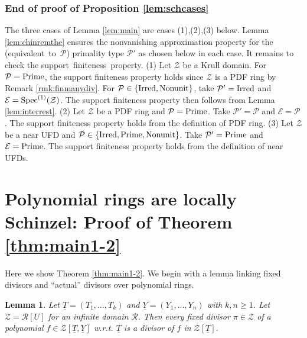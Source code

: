 \documentclass[11pt,a4paper,reqno]{amsart}
\def\s1{{\rm Spec}^{(1)}}
\newtheorem{lem}[thm]{Lemma}
\theoremstyle{definition}
\begin{document}
\subsubsection{End of proof of Proposition \ref{lem:schcases}}\label{ssc:enproof36} The three cases of Lemma \ref{lem:main} are cases (1),(2),(3) below. Lemma \ref{lem:chinremthe} ensures the nonvanishing approximation property for the \hbox{(equivalent to ${\mathcal P}$)} primal\-ity type $\mathcal{P}'$ as chosen below in each case. It remains to check the \hbox{support finiteness property.}
\vskip 1mm
\noindent
(1) Let $\mathcal{Z}$ be a Krull domain. For $\mathcal{P}={\rm Prime}$, the support finiteness property holds since $\mathcal{Z}$ is a PDF ring by Remark \ref{rmk:finmanydiv}. For $\mathcal{P} \in \{  {\rm Irred}, {\rm Nonunit}\}$, take $\mathcal{P}'={\rm Irred}$ and $\mathcal{E}=\s1(\mathcal{Z})$. The support finiteness property then follows from Lemma \ref{lem:interrest}.  
\vskip 1mm
\noindent
(2) Let $\mathcal{Z}$ be a  PDF ring and $\mathcal{P}={\rm Prime}$. Take $\mathcal{P}'=\mathcal{P}$ and $\mathcal{E}=\mathcal{P}$. The support finiteness property holds from the definition of PDF ring.\label{seccase:ss}
\vskip 1mm
\noindent
(3) Let $\mathcal{Z}$ be a near UFD and $\mathcal{P} \in \{ {\rm Irred}, {\rm Prime}, {\rm Nonunit}\}$. Take $\mathcal{P}'={\rm Prime}$ and $\mathcal{E}={\rm Prime}$. The support finiteness property holds from the definition of near UFDs.

\section{Polynomial rings are locally Schinzel: Proof of Theorem \ref{thm:main1-2}} 
\label{sec:poly-rings}

Here we show Theorem \ref{thm:main1-2}. We begin with a lemma linking fixed divisors and ``actual'' divisors over polynomial rings.

\begin{lem}
\label{lem:fixeddiv}
Let $\underline{T}=(T_1,\dots,T_k)$ and $\underline{Y}=(Y_1,\dots,Y_n)$ with $k ,n\geq 1$. Let $\mathcal{Z}=\mathcal{R}[U]$ for an infinite domain $\mathcal{R}$.  Then every fixed divisor $\pi\in \mathcal{Z}$ of a polynomial $f \in \mathcal{Z}[\underline{T},\underline{Y}]$ w.r.t. $\underline{T}$ is a divisor of $f$ in $\mathcal{Z}[\underline{T}]$. 
\end{lem}
\end{document}
